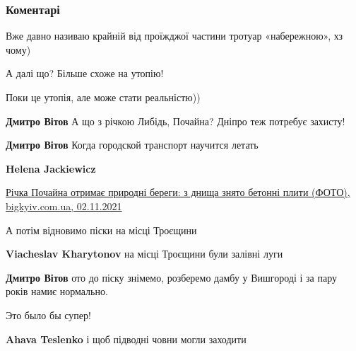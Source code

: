  
 
 
 
 
\subsubsection{Коментарі}

\begin{itemize} %
Вже давно називаю крайній від проїжджої частини тротуар «набережною», хз чому)

А далі що? Більше схоже на утопію!

\begin{itemize} %
Поки це утопія, але може стати реальністю))

\textbf{Дмитро Вітов} А що з річкою Либідь, Почайна? Дніпро теж потребує захисту!

\textbf{Дмитро Вітов} Когда городской транспорт научится летать

\textbf{Helena Jackiewicz}

\href{https://bigkyiv.com.ua/richka-pochajna-otrymaye-pryrodni-beregy-z-dnyshha-znyato-betonni-plyty-foto/}{%
Річка Почайна отримає природні береги: з днища знято бетонні плити (ФОТО), bigkyiv.com.ua, 02.11.2021%
}

\end{itemize} %

А потім відновимо піски на місці Троєщини

\begin{itemize} %
\textbf{Viacheslav Kharytonov} на місці Троєщини були залівні луги

\textbf{Дмитро Вітов} ото до піску знімемо, розберемо дамбу у Вишгороді і за пару років намиє нормально.
\end{itemize} %

Это было бы супер!

\textbf{Ahava Teslenko} і щоб підводні човни могли заходити


\end{itemize}
